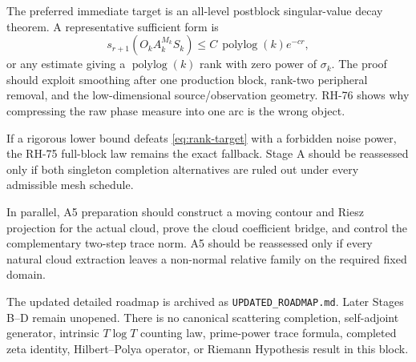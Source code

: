 \documentclass[11pt]{article}
\theoremstyle{definition}
\theoremstyle{remark}
\begin{document}
The preferred immediate target is an all-level postblock singular-value
decay theorem.  A representative sufficient form is
\begin{equation}
 s_{r+1}(O_kA_k^{M_k}S_k)
 \le C\,\operatorname{polylog}(k)e^{-cr},
 \label{eq:rank-target}
\end{equation}
or any estimate giving a $\operatorname{polylog}(k)$ rank with zero power of
$\sigma_k$.  The proof should exploit smoothing after one production block,
rank-two peripheral removal, and the low-dimensional source/observation
geometry.  RH-76 shows why compressing the raw phase measure into one arc is
the wrong object.

If a rigorous lower bound defeats \eqref{eq:rank-target} with a forbidden
noise power, the RH-75 full-block law remains the exact fallback.  Stage A
should be reassessed only if both singleton completion alternatives are ruled
out under every admissible mesh schedule.

In parallel, A5 preparation should construct a moving contour and Riesz
projection for the actual cloud, prove the cloud coefficient bridge, and
control the complementary two-step trace norm.  A5 should be reassessed only
if every natural cloud extraction leaves a non-normal relative family on the
required fixed domain.

The updated detailed roadmap is archived as \texttt{UPDATED\_ROADMAP.md}.
Later Stages B--D remain unopened.  There is no canonical scattering
completion, self-adjoint generator, intrinsic $T\log T$ counting law,
prime-power trace formula, completed zeta identity, Hilbert--Polya operator,
or Riemann Hypothesis result in this block.



\end{document}
